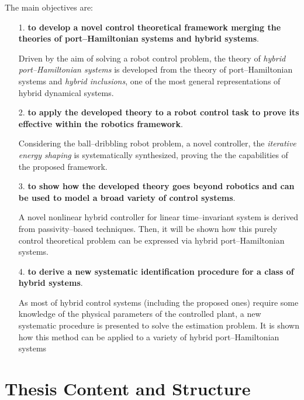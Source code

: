 The main objectives are:
%
\begin{itemize}
    \item [1.] \textbf{to develop a novel control theoretical framework merging the theories of port--Hamiltonian systems and hybrid systems}.
    
    Driven by the aim of solving a robot control problem, the theory of \textit{hybrid port--Hamiltonian systems} is developed from the theory of port--Hamiltonian systems and \textit{hybrid inclusions}, one of the most general representations of hybrid dynamical systems.
    \newline
    \item [2.] \textbf{to apply the developed theory to a robot control task to prove its effective within the robotics framework}. 
    
    Considering the ball--dribbling robot problem, a novel controller, the \textit{iterative energy shaping} is systematically synthesized, proving the the capabilities of the proposed framework.
    \newline
    \item [3.] \textbf{to show how the developed theory goes beyond robotics and can be used to model a broad variety of control systems}. 
    
    A novel nonlinear hybrid controller for linear time--invariant system is derived from passivity--based techniques. Then, it will be shown how this purely control theoretical problem can be expressed via hybrid port--Hamiltonian systems.
    \newline
    \item[4.] \textbf{to derive a new systematic identification procedure for a class of hybrid systems}.
    
    As most of hybrid control systems (including the proposed ones) require some knowledge of the physical parameters of the controlled plant, a new systematic procedure is presented to solve the estimation problem. It is shown how this method can be applied to a variety of hybrid port--Hamiltonian systems 
    
    \end{itemize}
%





%
\clearpage

\section{Thesis Content and Structure}
